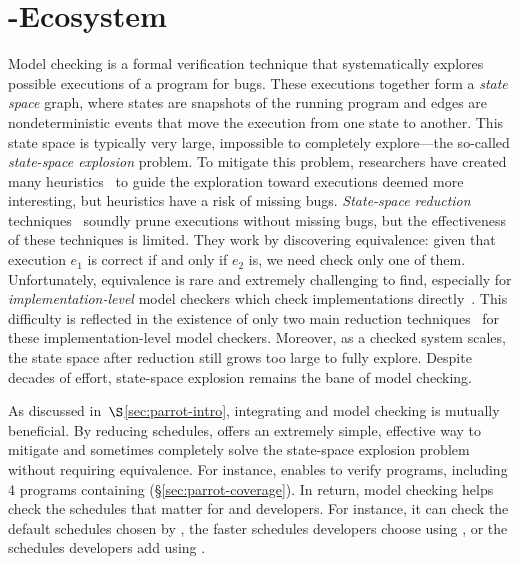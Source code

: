 \section{\parrot-\dbug Ecosystem} \label{sec:parrot-mc}



Model checking is a formal verification technique that systematically
explores possible executions of a program for bugs.  These executions
together form a \emph{state space} graph, where states are snapshots of the
running program and edges are nondeterministic events that move the
execution from one state to another.  This state space is typically very
large, impossible to completely explore---the so-called \emph{state-space
  explosion} problem.  To mitigate this problem, researchers have created
many heuristics~\cite{yang:fisc:osdi,musuvathi:aodv,killian:macemc:nsdi07} to guide the exploration toward executions
deemed more interesting, but heuristics have a risk of missing bugs.
\emph{State-space reduction} techniques~\cite{flanagan:dynamicpo,godefroid:verisoft,demeter:sosp11} soundly prune
executions without missing bugs, but the effectiveness of these techniques
is limited.  They work by discovering equivalence: given
that execution $e_1$ is correct if and only if $e_2$ is, we need check only
one of them. Unfortunately, equivalence is rare and extremely challenging
to find, especially for \emph{implementation-level} model checkers which
check implementations directly~\cite{godefroid:verisoft,musuvathi:aodv,yang:fisc:osdi,yang:explode:osdi,killian:macemc:nsdi07,dbug:spin11}.
This difficulty is reflected in the existence of only two main reduction
techniques~\cite{flanagan:dynamicpo, demeter:sosp11} for these implementation-level model
checkers.  Moreover, as a checked system scales, the state space after
reduction still grows too large to fully explore.  Despite
decades of effort, state-space explosion remains the bane of model
checking.

As discussed in~$\S$\ref{sec:parrot-intro}, integrating \smt and model checking is
mutually beneficial.  By reducing schedules, \smt offers an extremely
simple, effective way to mitigate and sometimes completely solve the
state-space explosion problem without requiring equivalence.  For
instance, \parrot enables \dbug to verify \nprogverifiedxxx programs,
including 4 programs containing \nondets (\S\ref{sec:parrot-coverage}).
In return, model
checking helps check the schedules that matter for \parrot and developers.
For instance, it can check the default schedules chosen by \parrot, the
faster schedules developers choose using \computes, or the schedules
developers add using \nondets.

